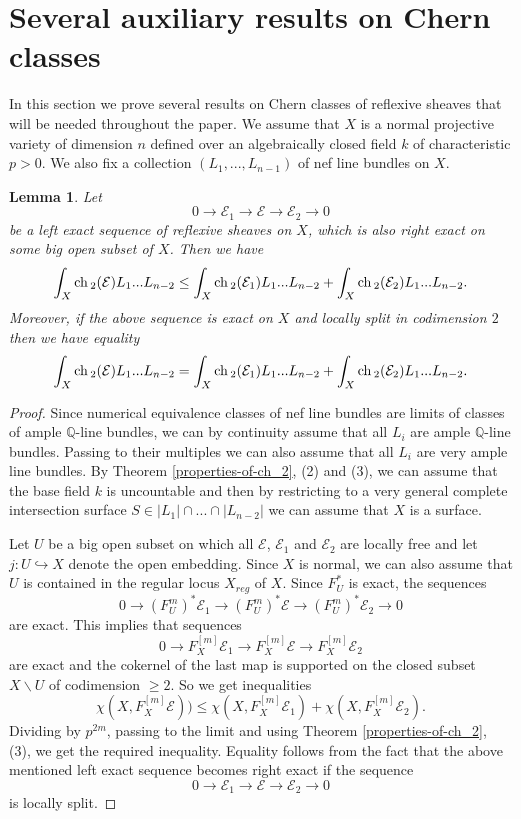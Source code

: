 \documentclass[12pt]{article}
\theoremstyle{plain}
\newtheorem{Lemma}[Thm]{\sc Lemma}
\theoremstyle{definition}
\theoremstyle{remark}
\newcommand{\QQ}{{\mathbb Q}}
\newcommand{\cE}{{\mathcal E}}
\newcommand{\ch}{{\mathop{\rm ch \, }}}
\begin{document}
\medskip

\section{Several auxiliary results on Chern classes}

In this section we prove several results on Chern classes of reflexive sheaves that will be needed throughout the paper.
We assume that $X$ is a normal projective variety of dimension $n$ defined over an algebraically closed field $k$ of characteristic $p>0$. We also fix a collection
$(L_1,...,L_{n-1})$ of nef line bundles on $X$. 

\begin{Lemma}\label{short-exact-seq}
Let $$0\to \cE_1\to \cE \to \cE_2\to 0$$
be a left exact sequence of reflexive sheaves on $X$, which is also right exact 
on some big open subset of $X$. Then we have
$$\int _X \ch _2 (\cE)L_1...L_{n-2} \le \int _X \ch _2 (\cE _1) L_1...L_{n-2}  +\int _X \ch _2 (\cE _2)L_1...L_{n-2} .$$
Moreover, if the above sequence is exact on $X$ and  locally split in codimension $2$ then we have equality
$$\int _X \ch _2 (\cE)L_1...L_{n-2} = \int _X \ch _2 (\cE _1)L_1...L_{n-2} +\int _X \ch _2 (\cE _2)L_1...L_{n-2} .$$
\end{Lemma}

\begin{proof}
Since numerical equivalence classes of nef line bundles are limits of classes of ample $\QQ$-line bundles, we can by continuity assume that all $L_i$ are ample $\QQ$-line bundles. Passing to their multiples we can also assume that all $L_i$ are very ample line bundles. By Theorem \ref{properties-of-ch_2}, (2) and (3), we can assume that the base field $k$ is uncountable and then
by restricting to a very general complete intersection surface $S\in |L_1|\cap ...\cap |L_{n-2}|$ we can assume that $X$ is a surface.

Let $U$ be a big open subset on which all $\cE$, $\cE_1$ and $\cE_2$ are locally free and let $j: U\hookrightarrow X$
denote the open embedding. Since $X$ is normal, we can also assume that $U$ is contained in the regular locus $X_{reg}$ of $X$. Since $F_U^*$ is exact, the sequences 
$$0\to (F_U^m)^*\cE_1\to (F_U^m)^* \cE \to (F_U^m)^*\cE_2\to 0$$
are exact. This implies that sequences
$$0\to F_X^{[m]}\cE_1\to F_X^{[m]} \cE \to F_X^{[m]} \cE_2 $$
are exact and the cokernel of the last map is supported on the closed subset $X\backslash U$ of codimension $\ge 2$. So we get inequalities 
$$ \chi (X, F_X^{[m]} \cE ) )\le  \chi (X, F_X^{[m]} \cE_1 )+ \chi (X, F_X^{[m]} \cE _2) .$$
Dividing by $p^{2m}$, passing to the limit and using Theorem \ref{properties-of-ch_2}, (3), we get the required inequality.
Equality follows from the fact that
the above mentioned left exact sequence becomes right exact if the sequence 
 $$0\to \cE_1\to \cE \to \cE_2\to 0$$
is locally split.
\end{proof}
\end{document}
